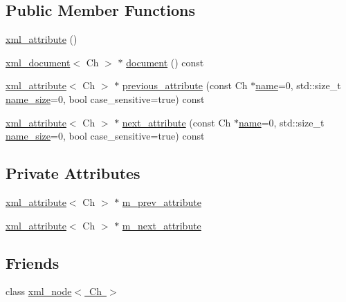 \subsection*{Public Member Functions}
\begin{DoxyCompactItemize}
\item 
\mbox{\hyperlink{classrapidxml_1_1xml__attribute_a26be291103917d3e8de110d46dd83816}{xml\+\_\+attribute}} ()
\item 
\mbox{\hyperlink{classrapidxml_1_1xml__document}{xml\+\_\+document}}$<$ Ch $>$ $\ast$ \mbox{\hyperlink{classrapidxml_1_1xml__attribute_ab0ff3bc7880a6969ddcf0bb1e0444077}{document}} () const
\item 
\mbox{\hyperlink{classrapidxml_1_1xml__attribute}{xml\+\_\+attribute}}$<$ Ch $>$ $\ast$ \mbox{\hyperlink{classrapidxml_1_1xml__attribute_abb0fb881f7247aefaec4b65b5eabc7ee}{previous\+\_\+attribute}} (const Ch $\ast$\mbox{\hyperlink{classrapidxml_1_1xml__base_aef8ae147fbee59209f714274afc80dc4}{name}}=0, std\+::size\+\_\+t \mbox{\hyperlink{classrapidxml_1_1xml__base_a20c8ffbe0c7a0b4231681ab8b99330a4}{name\+\_\+size}}=0, bool case\+\_\+sensitive=true) const
\item 
\mbox{\hyperlink{classrapidxml_1_1xml__attribute}{xml\+\_\+attribute}}$<$ Ch $>$ $\ast$ \mbox{\hyperlink{classrapidxml_1_1xml__attribute_affd0c8d0a9020df0998c507cae5474e5}{next\+\_\+attribute}} (const Ch $\ast$\mbox{\hyperlink{classrapidxml_1_1xml__base_aef8ae147fbee59209f714274afc80dc4}{name}}=0, std\+::size\+\_\+t \mbox{\hyperlink{classrapidxml_1_1xml__base_a20c8ffbe0c7a0b4231681ab8b99330a4}{name\+\_\+size}}=0, bool case\+\_\+sensitive=true) const
\end{DoxyCompactItemize}
\subsection*{Private Attributes}
\begin{DoxyCompactItemize}
\item 
\mbox{\hyperlink{classrapidxml_1_1xml__attribute}{xml\+\_\+attribute}}$<$ Ch $>$ $\ast$ \mbox{\hyperlink{classrapidxml_1_1xml__attribute_a204438287a5ad384405584726a1d8559}{m\+\_\+prev\+\_\+attribute}}
\item 
\mbox{\hyperlink{classrapidxml_1_1xml__attribute}{xml\+\_\+attribute}}$<$ Ch $>$ $\ast$ \mbox{\hyperlink{classrapidxml_1_1xml__attribute_a3254e4b040a9b71c6b6d1c27ec03352a}{m\+\_\+next\+\_\+attribute}}
\end{DoxyCompactItemize}
\subsection*{Friends}
\begin{DoxyCompactItemize}
\item 
class \mbox{\hyperlink{classrapidxml_1_1xml__attribute_aa7e464ce3fe512598ff8dda47291941f}{xml\+\_\+node$<$ Ch $>$}}
\end{DoxyCompactItemize}
